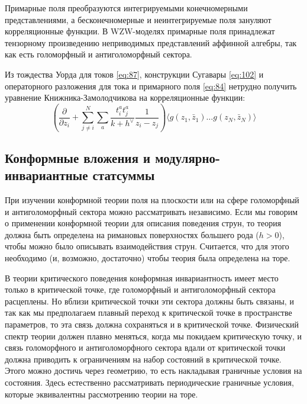 Примарные поля преобразуются  интегрируемыми конечномерными представлениями, а бесконечномерные и
неинтегрируемые поля зануляют корреляционные функции.
В WZW-моделях примарные поля
принадлежат тензорному произведению неприводимых представлений аффинной алгебры, так как есть
голоморфный и антиголоморфный сектора.

Из тождества Уорда для токов \eqref{eq:87}, конструкции Сугавары \eqref{eq:102} и операторного разложения для тока и примарного поля \eqref{eq:84} нетрудно получить уравнение Книжника-Замолодчикова на корреляционные функции:
\begin{equation}
  \label{eq:66}
  \left( \frac{\partial}{\partial z_i}+\sum_{j\neq i}^N \sum_a \frac{t^a_i t^a_j}{k+h^{\vee}}\frac{1}{z_i-z_j}\right) \langle g (z_1,\bar z_1)\dots g(z_N,\bar z_N)\rangle
\end{equation}


\subsection{Конформные вложения и модулярно-инвариантные статсуммы}
\label{sec:modular-invariance}

При изучении конформной теории поля на плоскости или на сфере 
голоморфный и антиголоморфный сектора можно рассматривать независимо. 
Если мы говорим о применении конформной теории для описания поведения струн, то теория должна быть
определена на римановых поверхностях большего рода ($h>0$), чтобы можно было описывать
взаимодействия струн. Считается, что для этого необходимо (и, возможно, достаточно) чтобы теория была определена на торе.

В теории критического поведения конформная инвариантность имеет место только в критической точке,
где голоморфный и антиголоморфный сектора расцеплены. Но вблизи критической точки эти сектора должны
быть связаны, и так как мы предполагаем плавный переход к критической точке в пространстве
параметров, то эта связь должна сохраняться и в критической точке. Физический спектр теории должен
плавно меняться, когда мы покидаем критическую точку, и связь голоморфного и антиголоморфного
сектора вдали от критической точки должна приводить к ограничениям на набор состояний в критической
точке. Этого можно достичь через геометрию, то есть накладывая граничные условия на состояния. Здесь
естественно рассматривать периодические граничные условия, которые эквивалентны рассмотрению теории
на торе.

